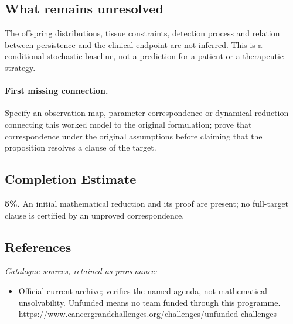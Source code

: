 \documentclass[11pt]{article}
\begin{document}
\subsection{What remains unresolved}
The offspring distributions, tissue constraints, detection process and relation between persistence and the clinical endpoint are not inferred. This is a conditional stochastic baseline, not a prediction for a patient or a therapeutic strategy.
\paragraph{First missing connection.} Specify an observation map, parameter correspondence or dynamical reduction connecting this worked model to the original formulation; prove that correspondence under the original assumptions before claiming that the proposition resolves a clause of the target.
\subsection{Completion Estimate}
\textbf{5\%.} An initial mathematical reduction and its proof are present; no full-target clause is certified by an unproved correspondence.
\subsection{References}
\noindent\emph{Catalogue sources, retained as provenance:}
\begin{itemize}
\item Official current archive; verifies the named agenda, not mathematical unsolvability. Unfunded means no team funded through this programme. \url{https://www.cancergrandchallenges.org/challenges/unfunded-challenges}
\end{itemize}
\end{document}
